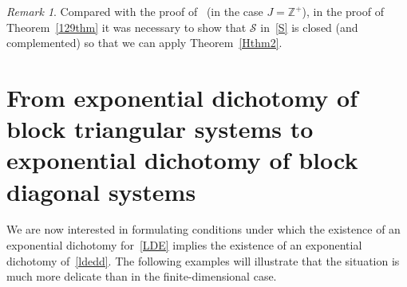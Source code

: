 \documentclass[11pt,reqno,a4paper]{amsart}
\theoremstyle{plain}
\numberwithin{equation}{section}
\theoremstyle{remark}
\newtheorem{remark}{Remark}
\def\Z{\mathbb{Z}}
\begin{document}
\begin{remark}\label{Remark5}
Compared with the proof of~\cite[Theorem 4]{DP} (in the case $J=\Z^+$), in the proof of Theorem~\ref{129thm} it was necessary to show that $\mathcal S$ in~\eqref{S} is closed (and complemented) so that we can apply Theorem~\ref{Hthm2}.

\end{remark}

\section{From exponential dichotomy of block triangular systems to exponential dichotomy of block diagonal systems}\label{Results2}

We are now interested in formulating conditions under which the existence of an exponential dichotomy for~\eqref{LDE} implies the existence of an exponential dichotomy of~\eqref{ldedd}. The following examples will illustrate that the situation is much more delicate than in the finite-dimensional case.
\end{document}
